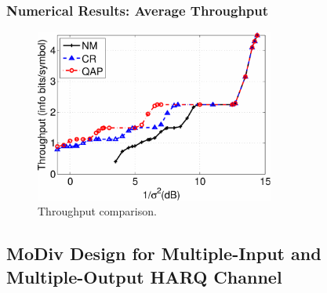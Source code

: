 \documentclass{beamer}
\begin{document}
\begin{frame}
  \frametitle{Numerical Results: Average Throughput}
  \begin{figure}
    \includegraphics[width=0.7\textwidth]{figs/throughput_6M_64QAM.pdf}
    \caption{Throughput comparison.}
  \end{figure}
\end{frame}

\subsection[MoDiv for MIMO-HARQ]{MoDiv Design for Multiple-Input and
Multiple-Output HARQ Channel}

\end{document}
